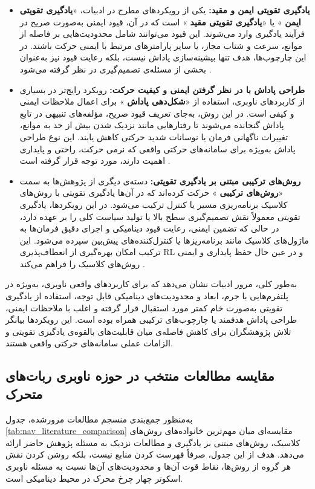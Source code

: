 \begin{itemize}
\item{\textbf{یادگیری تقویتی ایمن و مقید:}}
یکی از رویکردهای مطرح در ادبیات، «\textbf{یادگیری تقویتی ایمن}%
» یا «\textbf{یادگیری تقویتی مقید}%
» است که در آن، قیود ایمنی به‌صورت صریح در فرآیند یادگیری وارد می‌شوند. این قیود می‌توانند شامل محدودیت‌هایی بر فاصله از موانع، سرعت و شتاب مجاز، یا سایر پارامترهای مرتبط با ایمنی حرکت باشند. در این چارچوب‌ها، هدف تنها بیشینه‌سازی پاداش نیست، بلکه رعایت قیود نیز به‌عنوان بخشی از مسئله‌ی تصمیم‌گیری در نظر گرفته می‌شود%
\cite{Alsolami2025AutonomousNavigationSurvey}.

\item{\textbf{طراحی پاداش با در نظر گرفتن ایمنی و کیفیت حرکت:}}
رویکرد رایج‌تر در بسیاری از کاربردهای ناوبری، استفاده از «\textbf{شکل‌دهی پاداش}%
» برای اعمال ملاحظات ایمنی و کیفی است. در این روش، به‌جای تعریف قیود صریح، مؤلفه‌های تنبیهی در تابع پاداش گنجانده می‌شوند تا رفتارهایی مانند نزدیک شدن بیش از حد به موانع، تغییرات ناگهانی فرمان یا نوسانات شدید حرکتی کاهش یابند. این نوع طراحی پاداش به‌ویژه برای سامانه‌های حرکتی واقعی که نرمی حرکت، راحتی و پایداری اهمیت دارند، مورد توجه قرار گرفته است%
\cite{Le2024DRLNavigationSurvey}.

\item{\textbf{روش‌های ترکیبی مبتنی بر یادگیری تقویتی:}}
دسته‌ی دیگری از پژوهش‌ها به سمت «\textbf{روش‌های ترکیبی}%
» حرکت کرده‌اند که در آن‌ها یادگیری تقویتی با روش‌های کلاسیک برنامه‌ریزی مسیر یا کنترل ترکیب می‌شود. در این رویکردها، یادگیری تقویتی معمولاً نقش تصمیم‌گیری سطح بالا یا تولید سیاست کلی را بر عهده دارد، در حالی که تضمین ایمنی، رعایت قیود دینامیکی و اجرای دقیق فرمان‌ها به ماژول‌های کلاسیک مانند برنامه‌ریزها یا کنترل‌کننده‌های پیش‌بین سپرده می‌شود. این ترکیب امکان بهره‌گیری از انعطاف‌پذیری RL و در عین حال حفظ پایداری و ایمنی روش‌های کلاسیک را فراهم می‌کند%
\cite{Alsolami2025AutonomousNavigationSurvey}.
\end{itemize}
به‌طور کلی، مرور ادبیات نشان می‌دهد که برای کاربردهای واقعی ناوبری، به‌ویژه در پلتفرم‌هایی با جرم، ابعاد و محدودیت‌های دینامیکی قابل توجه، استفاده از یادگیری تقویتی به‌صورت خام کمتر مورد استقبال قرار گرفته و اغلب با ملاحظات ایمنی، طراحی پاداش هدفمند یا چارچوب‌های ترکیبی همراه بوده است. این رویکردها بیانگر تلاش پژوهشگران برای کاهش فاصله‌ی میان قابلیت‌های بالقوه‌ی یادگیری تقویتی و الزامات عملی سامانه‌های حرکتی واقعی هستند.
\subsection{مقایسه مطالعات منتخب در حوزه ناوبری ربات‌های متحرک}
به‌منظور جمع‌بندی منسجم مطالعات مرورشده، جدول \ref{tab:nav_literature_comparison} مقایسه‌ای میان مهم‌ترین خانواده‌های روش‌های کلاسیک، روش‌های مبتنی بر یادگیری و مطالعات نزدیک به مسئله پژوهش حاضر ارائه می‌دهد. هدف از این جدول، صرفاً فهرست کردن منابع نیست، بلکه روشن کردن نقش هر گروه از روش‌ها، نقاط قوت آن‌ها و محدودیت‌های آن‌ها نسبت به مسئله ناوبری اسکوتر چهار چرخ محرک در محیط دینامیکی است.

